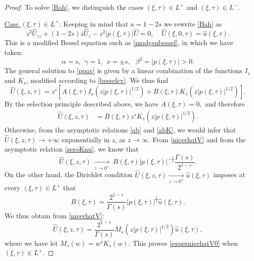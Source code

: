 \documentclass[11pt,letter]{amsart}
\def \G{\Gamma}
\numberwithin{equation}{section}
\numberwithin{equation}{section}
\begin{document}
\begin{proof}
To solve \eqref{Bah}, we distinguish the cases $(\xi,\tau)\in L^+$ and $(\xi,\tau)\in L^-$. 

\vskip 0.2in


\noindent \underline{Case $(\xi,\tau)\in L^+$}: Keeping in mind that $a=1-2s$ we rewrite \eqref{Bah} as 
\begin{equation}\label{ppav}
z^2 \widehat U_{zz} + (1-2s) z \widehat U_{z} - z^2 |p(\xi,\tau)| \widehat U = 0,\ \ \ \ \ \widehat U(\xi,0,\tau) = \hat u(\xi,\tau).
\end{equation}
This is a modified Bessel equation such as \eqref{modgenbessel}, in which we have taken:
\begin{equation}\label{alfabeta}
\alpha = s,\ \ \gamma = 1,\ \ \nu =  \pm s,\ \ \ \beta^2 = |p(\xi,\tau)|>0.
\end{equation}  
The general solution to \eqref{ppav} is given by a linear combination of the  functions $I_s$ and $K_s$, modified according to \eqref{besselcv}. We thus find  
\begin{equation}\label{notsonicehat}
\widehat U(\xi,z,\tau) = z^{s} \left[A(\xi,\tau) I_{s}(z |p(\xi,\tau)|^{1/2})+ B(\xi,\tau) K_{s}(z |p(\xi,\tau)|^{1/2})\right].
\end{equation}
By the selection principle described above, we have
$A(\xi,\tau) = 0,$
 and therefore  
\begin{align}\label{nicerhatV}
\widehat U(\xi,z,\tau) & = B(\xi,\tau) z^{s} K_{s}\left(z |p(\xi,\tau)|^{1/2}\right). 
\end{align}
Otherwise, from the asymptotic relations \eqref{ab} and \eqref{abK}, we would infer that $\widehat U(\xi,z,\tau)\to +\infty$ exponentially in $z$, as $z\to \infty$. 
From \eqref{nicerhatV} and from the asymptotic relation \eqref{zeroKnu}, we know that
\[
\widehat U(\xi,z,\tau)\ \underset{z\to 0^+}{\longrightarrow}\  B(\xi,\tau) |p(\xi,\tau)|^{-\frac{s}2} \frac{\G(s)}{2^{1-s}}.
\]
On the other hand, the Dirichlet condition $\widehat U(\xi,z,\tau) \underset{z\to 0^+}{\longrightarrow} \hat u(\xi,\tau)$ imposes at every $(\xi,\tau) \in L^+$ that
\[
B(\xi,\tau) = \frac{2^{1-s}}{ \G(s)}|p(\xi,\tau)|^{\frac{s}2} \hat u(\xi,\tau).
\]
We thus obtain from \eqref{nicerhatV}:
\begin{equation}\label{supernicehatV}
\widehat U(\xi,z,\tau)  = \frac{2^{1-s}}{ \G(s)} M_{s}\left(z |p(\xi,\tau)|^{1/2}\right) \hat u(\xi,\tau),
\end{equation}
where we have let $M_s(w) = w^{s} K_{s}(w)$. This proves \eqref{supernicehatV0} when $(\xi,\tau)\in L^+$.


\end{proof}
\end{document}

